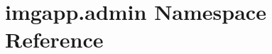 \hypertarget{namespaceimgapp_1_1admin}{}\section{imgapp.\+admin Namespace Reference}
\label{namespaceimgapp_1_1admin}
